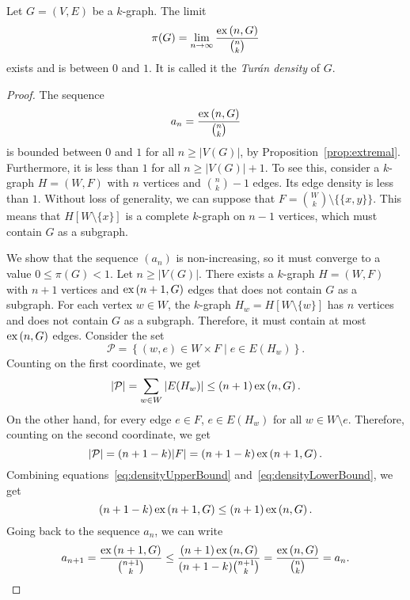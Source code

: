\begin{theorem}
    Let $G = (V, E)$ be a $k$-graph.
    The limit
    \begin{equation} \label{eq:turan_density}
        \pi(G) = \lim_{n \to \infty} \frac{\text{ex} \left( n, G \right)}{\binom{n}{k}}
    \end{equation}
    exists and is between $0$ and $1$.
    It is called it the \emph{Turán density} of $G$.
    \begin{proof}
        The sequence
        \[
            a_n = \frac{\text{ex} \left( n, G \right)}{\binom{n}{k}}
        \]
        is bounded between $0$ and $1$ for all $n \geq |V(G)|$, by Proposition~\ref{prop:extremal}.
        Furthermore, it is less than $1$ for all $n \geq |V(G)| + 1$.
        To see this, consider a $k$-graph $H = (W, F)$ with $n$ vertices and $\binom{n}{k} - 1$ edges.
        Its edge density is less than $1$.
        Without loss of generality, we can suppose that $F = \binom{W}{k} \setminus \{\{x, y\}\}$.
        This means that $H[W \setminus \{x\}]$ is a complete $k$-graph on $n - 1$ vertices,
        which must contain $G$ as a subgraph.

        We show that the sequence $(a_n)$ is non-increasing, so it must converge to a value $0 \leq \pi(G) < 1$.
        Let $n \geq |V(G)|$.
        There exists a $k$-graph $H = (W, F)$ with $n+1$ vertices and $\text{ex} \left( n+1, G \right)$ edges that does not contain
        $G$ as a subgraph.
        For each vertex $w \in W$, the $k$-graph $H_w = H[W \setminus \{w\}]$ has $n$ vertices
        and does not contain $G$ as a subgraph.
        Therefore, it must contain at most $\text{ex} \left( n, G \right)$ edges.
        Consider the set
        \[
            \mathcal{P} = \left\{ (w, e) \in W \times F \mid e \in E(H_w) \right\}.
        \]
        Counting on the first coordinate, we get
        \begin{equation} \label{eq:densityUpperBound}
            |\mathcal{P}| = \sum_{w \in W} |E(H_w)| \leq (n+1)\, \text{ex} \left( n, G \right).
        \end{equation}
        On the other hand, for every edge $e \in F$, $e \in E(H_w)$
        for all $w \in W \setminus e$.
        Therefore, counting on the second coordinate, we get
        \begin{equation} \label{eq:densityLowerBound}
            |\mathcal{P}| = (n + 1 - k) |F| = (n + 1 - k)\, \text{ex} \left( n+1, G \right).
        \end{equation}
        Combining equations~\eqref{eq:densityUpperBound} and~\eqref{eq:densityLowerBound},
        we get
        \[
            (n + 1 - k)\, \text{ex} \left( n+1, G \right) \leq (n + 1)\, \text{ex} \left( n, G \right).
        \]
        Going back to the sequence $a_n$, we can write
        \[
            a_{n+1} = \frac{\text{ex} \left( n+1, G \right)}{\binom{n+1}{k}} \leq
            \frac{(n + 1)\, \text{ex} \left( n, G \right)}{(n + 1 - k) \binom{n+1}{k}} =
            \frac{\text{ex} \left( n, G \right)}{\binom{n}{k}} = a_n. \qedhere
        \]
    \end{proof}
\end{theorem}

